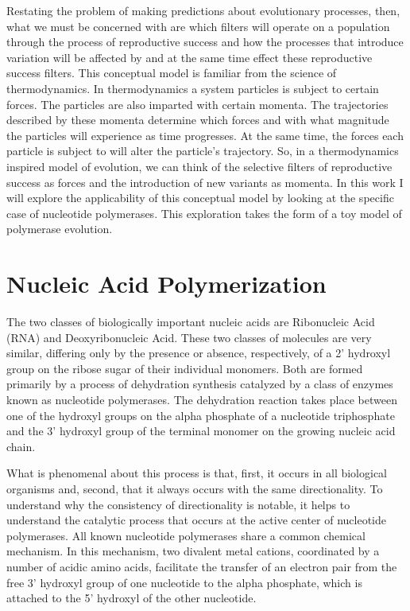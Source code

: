 Restating the problem of making predictions about evolutionary processes, then, what we must be concerned with are which filters will operate on a population through the process of reproductive success and how the processes that introduce variation will be affected by and at the same time effect these reproductive success filters. This conceptual model is familiar from the science of thermodynamics. In thermodynamics a system particles is subject to certain forces. The particles are also imparted with certain momenta. The trajectories described by these momenta determine which forces and with what magnitude the particles will experience as time progresses. At the same time, the forces each particle is subject to will alter the particle's trajectory. So, in a thermodynamics inspired model of evolution, we can think of the selective filters of reproductive success as forces and the introduction of new variants as momenta. In this work I will explore the applicability of this conceptual model by looking at the specific case of nucleotide polymerases. This exploration takes the form of a toy model of polymerase evolution.

\section*{Nucleic Acid Polymerization} %
\label{sec:nucleotide_polymerization}
The two classes of biologically important nucleic acids are Ribonucleic Acid (RNA) and Deoxyribonucleic Acid. These two classes of molecules are very similar, differing only by the presence or absence, respectively, of a 2' hydroxyl group on the ribose sugar of their individual monomers. Both are formed primarily by a process of dehydration synthesis catalyzed by a class of enzymes known as nucleotide polymerases. The dehydration reaction takes place between one of the hydroxyl groups on the alpha phosphate of a nucleotide triphosphate and the 3' hydroxyl group of the terminal monomer on the growing nucleic acid chain.

What is phenomenal about this process is that, first, it occurs in all biological organisms and, second, that it always occurs with the same directionality. To understand why the consistency of directionality is notable, it helps to understand the catalytic process that occurs at the active center of nucleotide polymerases. All known nucleotide polymerases share a common chemical mechanism. In this mechanism, two divalent metal cations, coordinated by a number of acidic amino acids, facilitate the transfer of an electron pair from the free 3' hydroxyl group of one nucleotide to the alpha phosphate, which is attached to the 5' hydroxyl of the other nucleotide.

